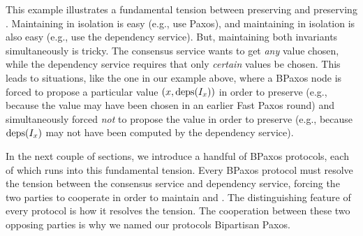 This example illustrates a fundamental tension between preserving
 and preserving .
Maintaining  in isolation is easy (e.g., use Paxos),
and maintaining  in isolation is also easy (e.g., use
the dependency service). But, maintaining both invariants simultaneously is
tricky. The consensus service wants to get \emph{any} value chosen, while the
dependency service requires that only \emph{certain} values be chosen.
%
This leads to situations, like the one in our example above, where a BPaxos
node is forced to propose a particular value $(x, \text{deps}(I_x))$ in order to
preserve  (e.g., because the value may have been
chosen in an earlier Fast Paxos round) and simultaneously forced \emph{not} to
propose the value in order to preserve  (e.g.,
because $\text{deps}(I_x)$ may not have been computed by the dependency service).

In the next couple of sections, we introduce a handful of BPaxos protocols,
each of which runs into this fundamental tension. Every BPaxos protocol must
resolve the tension between the consensus service and dependency service,
forcing the two parties to cooperate in order to maintain
 and . The distinguishing
feature of every protocol is how it resolves the tension.  The cooperation
between these two opposing parties is why we named our protocols Bipartisan
Paxos.
